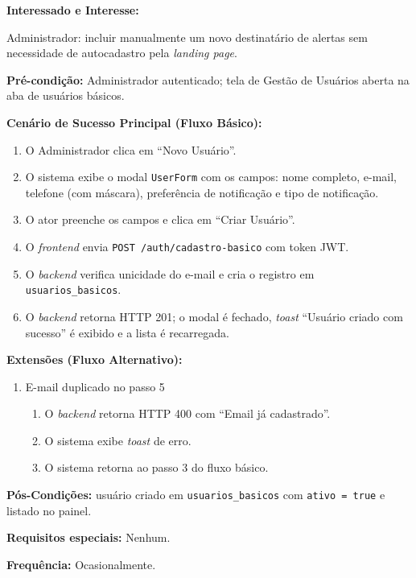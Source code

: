 \textbf{Interessado e Interesse:}

Administrador: incluir manualmente um novo destinatário de
alertas sem necessidade de autocadastro pela \textit{landing
page}.

\textbf{Pré-condição:} Administrador autenticado; tela de
Gestão de Usuários aberta na aba de usuários básicos.

\textbf{Cenário de Sucesso Principal (Fluxo Básico):}
\begin{enumerate}
  \item O Administrador clica em ``Novo Usuário''.
  \item O sistema exibe o modal \texttt{UserForm} com os
        campos: nome completo, e-mail, telefone (com
        máscara), preferência de notificação e tipo de
        notificação.
  \item O ator preenche os campos e clica em
        ``Criar Usuário''.
  \item O \textit{frontend} envia
        \texttt{POST /auth/cadastro-basico} com token JWT.
  \item O \textit{backend} verifica unicidade do e-mail
        e cria o registro em \texttt{usuarios\_basicos}.
  \item O \textit{backend} retorna HTTP 201; o modal é
        fechado, \textit{toast} ``Usuário criado com
        sucesso'' é exibido e a lista é recarregada.
\end{enumerate}

\textbf{Extensões (Fluxo Alternativo):}

\begin{enumerate}
  \renewcommand{\theenumi}{5a}
  \renewcommand{\labelenumi}{\theenumi.}
  \item E-mail duplicado no passo 5
  \begin{enumerate}
  \item O \textit{backend} retorna HTTP 400 com
        ``Email já cadastrado''.
  \item O sistema exibe \textit{toast} de erro.
  \item O sistema retorna ao passo 3 do fluxo básico.
  \end{enumerate}
\end{enumerate}

\textbf{Pós-Condições:} usuário criado em
\texttt{usuarios\_basicos} com \texttt{ativo = true}
e listado no painel.

\textbf{Requisitos especiais:} Nenhum.

\textbf{Frequência:} Ocasionalmente.

